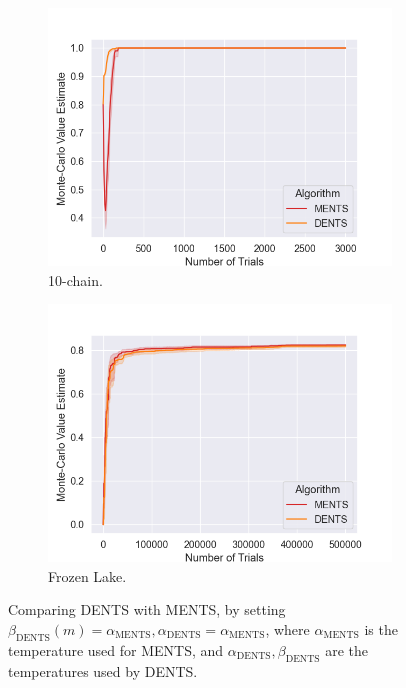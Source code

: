             
            \begin{figure}
                \centering
                \begin{subfigure}[b]{0.49\textwidth}
                    \centering
                    \includegraphics[width=\textwidth]{figures/temp/dbments/dbments_dchain.png}
                    \caption{10-chain.}
                \end{subfigure}
                \begin{subfigure}[b]{0.49\textwidth}
                    \centering
                    \includegraphics[width=\textwidth]{figures/temp/dbments/dbments_fl.png}
                    \caption{Frozen Lake.}
                \end{subfigure}
                \caption{Comparing DENTS with MENTS, by setting $\beta_{\text{DENTS}}(m)=\alpha_{\text{MENTS}}, \alpha_{\text{DENTS}}=\alpha_{\text{MENTS}}$, where $\alpha_{\text{MENTS}}$ is the temperature used for MENTS, and $\alpha_{\text{DENTS}},\beta_{\text{DENTS}}$ are the temperatures used by DENTS.  }
                \label{fig:dbments}
            \end{figure}



